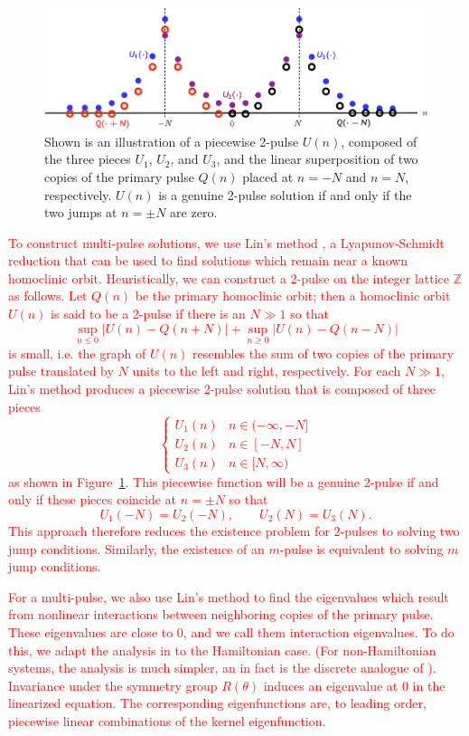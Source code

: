 \documentclass[12pt]{elsarticle}
\newcommand{\revised}[1]{ \textcolor{red}{#1} }
\begin{document}
\begin{figure}
    \centering
    \includegraphics[scale=0.8]{images/LinsMethod}
    \caption{Shown is an illustration of a piecewise 2-pulse $U(n)$, composed of the three pieces $U_1$, $U_2$, and $U_3$, and the linear superposition of two copies of the primary pulse $Q(n)$ placed at $n=-N$ and $n=N$, respectively. $U(n)$ is a genuine 2-pulse solution if and only if the two jumps at $n = \pm N$ are zero.}
    \label{fig:lin}
\end{figure}

\revised{To construct multi-pulse solutions, we use Lin's method \cite{Lin1990, Lin2008,Knobloch2000}, a Lyapunov-Schmidt reduction that can be used to find solutions which remain near a known homoclinic orbit. Heuristically, we can construct a 2-pulse on the integer lattice $\mathbb{Z}$ as follows. Let $Q(n)$ be the primary homoclinic orbit; then a homoclinic orbit $U(n)$ is said to be a 2-pulse if there is an $N\gg1$ so that
\[
\sup_{n\leq0} |U(n) - Q(n+N)| + \sup_{n\geq0} |U(n) - Q(n-N)|
\]
is small, i.e. the graph of $U(n)$ resembles the sum of two copies of the primary pulse translated by $N$ units to the left and right, respectively. For each $N\gg1$, Lin's method produces a piecewise 2-pulse solution that is composed of three pieces
\begin{equation*}
\begin{cases}
U_1(n) & n \in (-\infty, -N] \\
U_2(n) & n \in [-N, N] \\
U_3(n) & n \in [N, \infty)
\end{cases}
\end{equation*}
as shown in Figure~\ref{fig:lin}. This piecewise function will be a genuine 2-pulse if and only if these pieces coincide at $n=\pm N$ so that
\[
U_1(-N) = U_2(-N), \qquad
U_2(N) = U_3(N).
\]
This approach therefore reduces the existence problem for 2-pulses to solving two jump conditions. Similarly, the existence of an $m$-pulse is equivalent to solving $m$ jump conditions.}

\revised{For a multi-pulse, we also use Lin's method to find the eigenvalues which result from nonlinear interactions between neighboring copies of the primary pulse. These eigenvalues are close to 0, and we call them interaction eigenvalues. To do this, we adapt the analysis in \cite{Sandstede1998} to the Hamiltonian case. (For non-Hamiltonian systems, the analysis is much simpler, an in fact is the discrete analogue of \cite{Sandstede1998}). Invariance under the symmetry group $R(\theta)$ induces an eigenvalue at 0 in the linearized equation. The corresponding eigenfunctions are, to leading order, piecewise linear combinations of the kernel eigenfunction.}
\end{document}
